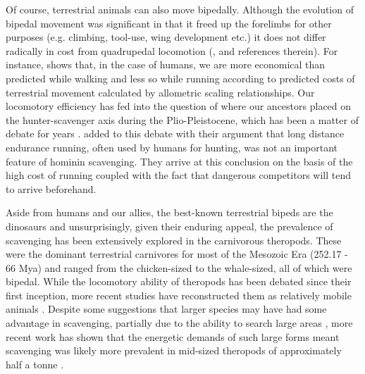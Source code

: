 \documentclass[a4paper,12pt]{article}
\begin{document}
Of course, terrestrial animals can also move bipedally. 
Although the evolution of bipedal  movement was significant in that it freed up the forelimbs for other purposes (e.g. climbing, tool-use, wing development etc.) it does not differ radically in cost from quadrupedal locomotion (\cite{williams1999evolution}, and references therein). 
For instance, \cite{alexander2004bipedal} shows  that, in the case of humans, we are more economical than predicted while walking and less so while running according to predicted costs of terrestrial movement calculated by allometric scaling relationships.
Our locomotory efficiency has fed into the question of where our ancestors placed on the hunter-scavenger axis during the Plio-Pleistocene, which has been a matter of debate for years \citep{dominguez2002hunting}.
\cite{ruxton2013endurance} added to this debate with their argument that long distance endurance running, often used by humans for hunting, was not an important feature of hominin scavenging.
They arrive at this conclusion on the basis of the high cost of running coupled with the fact that dangerous competitors will tend to arrive beforehand. 



Aside from humans and our allies, the best-known terrestrial bipeds are the dinosaurs and unsurprisingly, given their enduring appeal, the prevalence of scavenging has been extensively explored in the carnivorous theropods.
These were the dominant terrestrial carnivores for most of the Mesozoic Era (252.17 - 66 Mya) and ranged from the chicken-sized to the whale-sized, all of which were bipedal.
While the locomotory ability of theropods has been debated since their first inception, more recent studies have reconstructed them as relatively mobile animals \citep{pontzer2009biomechanics}. 
Despite some suggestions that larger species may have had some advantage in scavenging, partially due to the ability to search large areas \citep{ruxton2003could}, more recent work has shown that the energetic demands of such large forms meant scavenging was likely more prevalent in mid-sized theropods of approximately half a tonne \citep{kane2016body}.
\end{document}
